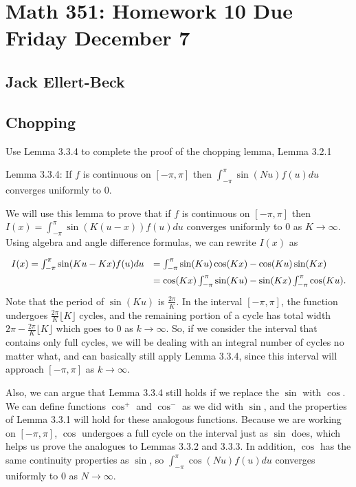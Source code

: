 \documentclass[11pt]{article}
\begin{document}
\setlength{\parindent}{0pt}
\setlength{\parskip}{9pt}


\section*{Math 351: Homework 10 Due Friday December 7}
\subsection*{Jack Ellert-Beck}

\bigskip

\subsection*{Chopping}

Use Lemma 3.3.4 to complete the proof of the chopping lemma, Lemma 3.2.1

Lemma 3.3.4: If $f$ is continuous on $[-\pi,\pi]$ then
$\int_{-\pi}^\pi\sin(Nu)f(u)du$ converges uniformly to 0.

We will use this lemma to prove that if $f$ is continuous on $[-\pi,\pi]$
then
$I(x)=\int_{-\pi}^{\pi}\sin(K(u-x))f(u)du$
converges uniformly to 0 as $K\to\infty$.
Using algebra and angle difference formulas, we can rewrite $I(x)$ as
\[
\def\arraystretch{1.5}
\begin{array}{rl}
I(x)=\int_{-\pi}^\pi\sin(Ku-Kx)f(u)du &=
    \int_{-\pi}^\pi\sin(Ku)\cos(Kx)-\cos(Ku)\sin(Kx) \\
&= \cos(Kx)\int_{-\pi}^\pi\sin(Ku)-\sin(Kx)\int_{-\pi}^\pi\cos(Ku).
\end{array}
\]
Note that the period of $\sin(Ku)$ is $\frac{2\pi}{K}$.
In the interval $[-\pi,\pi]$, the function undergoes
$\frac{2\pi}{K}\lfloor K\rfloor$ cycles, and the remaining portion of 
a cycle has total width $2\pi-\frac{2\pi}{K}\lfloor K\rfloor$ which
goes to 0 as $k\to\infty$. So, if we consider the interval that contains
only full cycles, we will be dealing with an integral number of cycles
no matter what, and can basically still apply Lemma 3.3.4, since this
interval will approach $[-\pi,\pi]$ as $k\to\infty$.

Also, we can argue that Lemma 3.3.4 still holds if we replace the $\sin$
with $\cos$. We can define functions $\cos^{+}$ and $\cos^{-}$ as
we did with $\sin$, and the properties of Lemma 3.3.1 will hold for these
analogous functions.
Because we are working on $[-\pi,\pi]$, $\cos$ undergoes a full
cycle on the interval just as $\sin$ does, which helps us prove the analogues
to Lemmas 3.3.2 and 3.3.3. In addition, $\cos$ has the same continuity
properties as $\sin$, so $\int_{-\pi}^\pi\cos(Nu)f(u)du$ converges
uniformly to 0 as $N\to\infty$.
\end{document}
